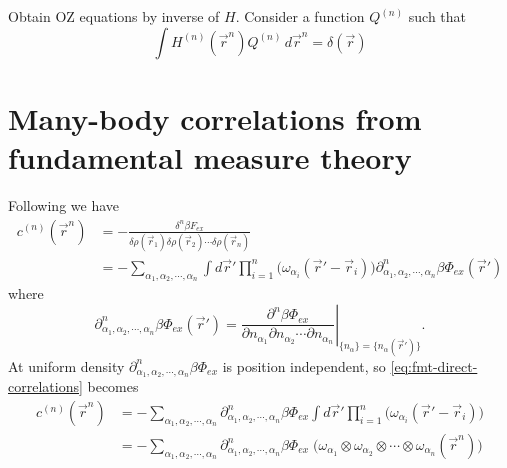 \documentclass[12pt]{report}
\begin{document}
Obtain OZ equations by inverse of $H$.
Consider a function $Q^{(n)}$ such that
\begin{equation}
  \int H^{(n)}(\vec{r}^n) Q^{(n)} \, d\vec{r}^n =
  \delta(\vec{r})
\end{equation}

\section{Many-body correlations from fundamental measure theory}

Following \cite{Rosenfeld1990} we have
\begin{equation}\label{eq:fmt-direct-correlations}
  \begin{aligned}
    c^{(n)}(\vec{r}^n) &=
    - \frac{\delta^n \beta F_{ex}}{\delta \rho(\vec{r}_1)\delta \rho(\vec{r}_2) \cdots \delta \rho(\vec{r}_n)} \\
    &=
    - \sum_{\alpha_1, \alpha_2, \cdots, \alpha_n}
    \int d\vec{r}'
    \prod_{i=1}^n \Big( \omega_{\alpha_i}(\vec{r}' - \vec{r}_i) \Big)
    \partial^n_{\alpha_1, \alpha_2, \cdots, \alpha_n} \beta\Phi_{ex}(\vec{r}')
  \end{aligned}
\end{equation}
where
\begin{equation*}
  \partial^n_{\alpha_1, \alpha_2, \cdots, \alpha_n} \beta\Phi_{ex}(\vec{r}') =
  \left.
  \frac{\partial^n \beta\Phi_{ex}}{\partial n_{\alpha_1} \partial n_{\alpha_2} \cdots \partial n_{\alpha_n}}
  \right|_{\{n_\alpha\} = \{n_\alpha(\vec{r}')\}}.
\end{equation*}
At uniform density $\partial^n_{\alpha_1, \alpha_2, \cdots, \alpha_n} \beta\Phi_{ex}$ is position independent, so \eqref{eq:fmt-direct-correlations} becomes
\begin{equation}\label{eq:fmt-direct-correlations-uniform-density}
  \begin{aligned}
    c^{(n)}(\vec{r}^n) &=
    - \sum_{\alpha_1, \alpha_2, \cdots, \alpha_n}
    \partial^n_{\alpha_1, \alpha_2, \cdots, \alpha_n} \beta\Phi_{ex}
    \int d\vec{r}'
    \prod_{i=1}^n \Big( \omega_{\alpha_i}(\vec{r}' - \vec{r}_i) \Big) \\
    &=
    - \sum_{\alpha_1, \alpha_2, \cdots, \alpha_n}
    \partial^n_{\alpha_1, \alpha_2, \cdots, \alpha_n} \beta\Phi_{ex} \;
    \Big(
    \omega_{\alpha_1} \otimes \omega_{\alpha_2} \otimes \cdots \otimes \omega_{\alpha_n}
    (\vec{r}^n)
    \Big)
  \end{aligned}
\end{equation}
\end{document}

